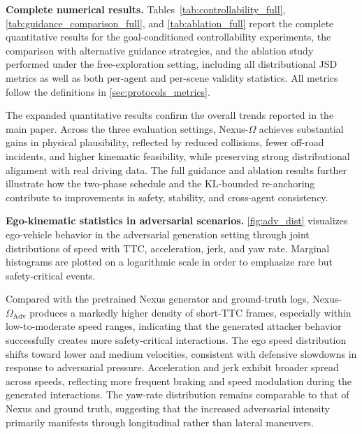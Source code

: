 \documentclass[10pt,twocolumn,letterpaper]{article}
\theoremstyle{plain}
\theoremstyle{remark}
\renewcommand{\paragraph}[1]{\vspace{.5em}\noindent\textbf{#1.}}
\begin{document}
\paragraph{Complete numerical results}
Tables~\ref{tab:controllability_full}, \ref{tab:guidance_comparison_full},
and \ref{tab:ablation_full} report the complete quantitative results
for the goal-conditioned controllability experiments, the
comparison with alternative guidance strategies, and the ablation
study performed under the free-exploration setting, including all distributional JSD metrics as well as both per-agent and per-scene validity statistics.  
All metrics follow the definitions in \cref{sec:protocols_metrics}.

The expanded quantitative results confirm the overall trends
reported in the main paper. Across the three evaluation settings,
Nexus-$\Omega$ achieves substantial gains in physical
plausibility, reflected by reduced collisions, fewer off-road
incidents, and higher kinematic feasibility, while preserving strong distributional
alignment with real driving data.  
The full guidance and ablation results further illustrate how the
two-phase schedule and the KL-bounded re-anchoring contribute to
improvements in safety, stability, and cross-agent consistency.

\paragraph{Ego-kinematic statistics in adversarial scenarios}
\cref{fig:adv_dist} visualizes ego-vehicle behavior in the
adversarial generation setting through joint distributions of
speed with TTC, acceleration, jerk, and yaw rate.  
Marginal histograms are plotted on a logarithmic scale in order
to emphasize rare but safety-critical events.

Compared with the pretrained Nexus generator and ground-truth
logs, Nexus-$\Omega_{\mathrm{Adv}}$ produces a markedly higher
density of short-TTC frames, especially within low-to-moderate
speed ranges, indicating that the generated attacker behavior
successfully creates more safety-critical interactions.
The ego speed distribution shifts toward lower and medium
velocities, consistent with defensive slowdowns in response to
adversarial pressure.  
Acceleration and jerk exhibit broader spread across speeds,
reflecting more frequent braking and speed modulation during the
generated interactions.  
The yaw-rate distribution remains comparable to that of Nexus and
ground truth, suggesting that the increased adversarial intensity
primarily manifests through longitudinal rather than lateral
maneuvers.
\end{document}
